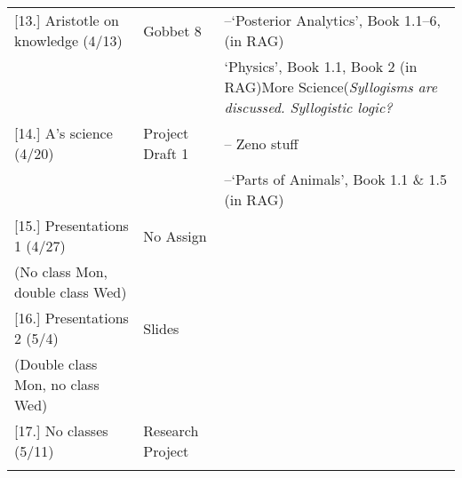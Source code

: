 \documentclass[article,oneside]{memoir}
\begin{document}
\begin{center}
\begin{longtable}{p{4.5cm}p{2cm}p{6cm}}
[13.] Aristotle on knowledge (4/13)	& Gobbet 8			& --`Posterior Analytics', Book 1.1--6, (in RAG) \\
						    	& 					& `Physics', Book 1.1, Book 2 (in RAG)More Science(\emph{Syllogisms are discussed. Syllogistic logic?} \\ [1.8\baselineskip]
                                    

[14.] A's science 		(4/20)		& Project Draft 1	& -- Zeno stuff \\ 
			    					& 					& --`Parts of Animals', Book 1.1 \& 1.5 (in RAG) \\ [1.8\baselineskip]

[15.] Presentations 1 (4/27)		& No Assign			&  \\ 
(No class Mon, double class Wed)	&					&  \\ [1.8\baselineskip]
												 
[16.] Presentations 2 (5/4)	    	& Slides			& \\
(Double class Mon, no class Wed)    &			 	    &  \\ [1.8\baselineskip]

[17.] No classes (5/11)				& Research Project 	& \\ 
				 		     		&			       	& \\ [1.8\baselineskip]
	

\end{longtable}
\end{center}



\end{document}
